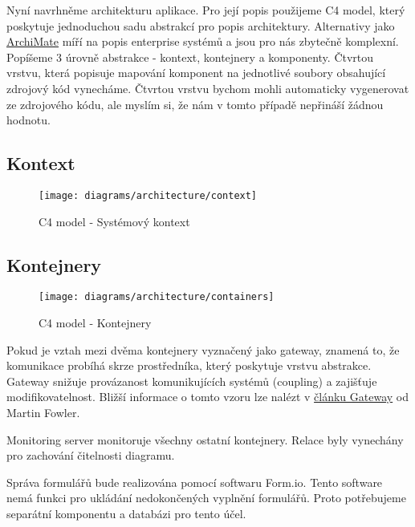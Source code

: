 Nyní navrhněme architekturu aplikace.
Pro její popis použijeme C4 model, který poskytuje jednoduchou sadu abstrakcí pro popis architektury.
Alternativy jako \href{https://www.opengroup.org/archimate-forum}{ArchiMate} míří na popis enterprise systémů a jsou pro nás zbytečně komplexní.
Popíšeme 3 úrovně abstrakce - kontext, kontejnery a komponenty.
Čtvrtou vrstvu, která popisuje mapování komponent na jednotlivé soubory obsahující zdrojový kód vynecháme.
Čtvrtou vrstvu bychom mohli automaticky vygenerovat ze zdrojového kódu, ale myslím si, že nám v tomto případě nepřináší žádnou hodnotu.

\subsection{Kontext}\label{subsec:kontext}

\begin{figure}[H]
    \texttt{[image: diagrams/architecture/context]}
    \caption{C4 model - Systémový kontext}\label{fig:architecture-context}
\end{figure}

\subsection{Kontejnery}\label{subsec:kontejnery}

\begin{figure}[H]
    \texttt{[image: diagrams/architecture/containers]}
    \caption{C4 model - Kontejnery}\label{fig:architecture-containers}
\end{figure}

\begin{tcolorbox}
    Pokud je vztah mezi dvěma kontejnery vyznačený jako gateway, znamená to, že komunikace probíhá skrze prostředníka, který poskytuje vrstvu abstrakce.
    Gateway snižuje provázanost komunikujících systémů (coupling) a zajišťuje modifikovatelnost.
    Bližší informace o tomto vzoru lze nalézt v \href{https://martinfowler.com/articles/gateway-pattern.html}{článku Gateway} od Martin Fowler.
\end{tcolorbox}

\begin{tcolorbox}
    Monitoring server monitoruje všechny ostatní kontejnery.
    Relace byly vynechány pro zachování čitelnosti diagramu.
\end{tcolorbox}

Správa formulářů bude realizována pomocí softwaru Form.io.
Tento software nemá funkci pro ukládání nedokončených vyplnění formulářů.
Proto potřebujeme separátní komponentu a databázi pro tento účel.


